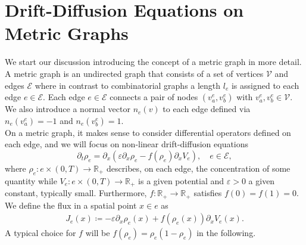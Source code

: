 \section{Drift-Diffusion Equations on Metric Graphs}

We start our discussion introducing the concept of a metric graph in more detail.  A metric graph is an undirected graph that consists of a set of vertices $\mathcal{V}$ and edges $\mathcal{E}$ where in contrast to combinatorial graphs a length $l_e$ is assigned to each edge $e\in \mathcal{E}.$  Each edge $e \in \mathcal{E}$ connects a pair of nodes $(v^e_a,v^e_b)$ with $v^e_a,v^e_b\in \mathcal{V}$. We also introduce a normal vector $n_e(v)$ to each edge defined via $n_e(v^e_a) = -1$ and $n_e(v^e_b) = 1$. \\
On a metric graph, it makes sense to consider differential operators defined on each edge, and we will focus on non-linear drift-diffusion equations
\begin{equation}
    \label{eq:strong_pde}
    \partial_t \rho_e  = \partial_x (\varepsilon \partial_x \rho_e - f(\rho_e) \partial_x V_e), \quad e \in \mathcal{E},
\end{equation}
where $\rho_e \colon e \times (0,T) \to \mathbb{R}_{+}$ describes, on each edge, the concentration of some quantity while $V_e\colon e \times (0,T) \to \mathbb{R}_{+}$ is a given potential and $\varepsilon > 0$ a given constant, typically small. Furthermore, $f\colon \mathbb{R}_{+} \to \mathbb{R}_{+}$ satisfies $f(0) = f(1) = 0$. We define the flux in a spatial point $x \in e$ as 
\begin{align} 
    \label{eq:flux} 
    J_e(x) \coloneqq - \varepsilon \partial_x \rho_e (x) + f(\rho_e(x)) \partial_x V_e(x).
\end{align}
A typical choice for $f$ will be $f(\rho_e) = \rho_e(1-\rho_e)$ in the following. 

